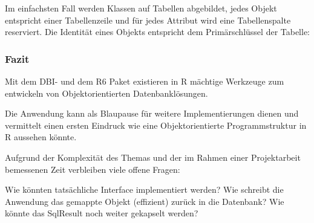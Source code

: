 \documentclass[]{article}
\newenvironment{Shaded}{\begin{snugshade}}{\end{snugshade}}
\newcommand{\CommentTok}[1]{\textcolor[rgb]{0.56,0.35,0.01}{\textit{#1}}}
\newcommand{\DecValTok}[1]{\textcolor[rgb]{0.00,0.00,0.81}{#1}}
\newcommand{\KeywordTok}[1]{\textcolor[rgb]{0.13,0.29,0.53}{\textbf{#1}}}
\newcommand{\NormalTok}[1]{#1}
\newcommand{\OperatorTok}[1]{\textcolor[rgb]{0.81,0.36,0.00}{\textbf{#1}}}
\begin{document}
Im einfachsten Fall werden Klassen auf Tabellen abgebildet, jedes Objekt
entspricht einer Tabellenzeile und für jedes Attribut wird eine
Tabellenspalte reserviert. Die Identität eines Objekts entspricht dem
Primärschlüssel der Tabelle:

\begin{Shaded}
\end{Shaded}

\hypertarget{fazit}{%
\subsubsection{Fazit}\label{fazit}}

Mit dem DBI- und dem R6 Paket existieren in R mächtige Werkzeuge zum
entwickeln von Objektorientierten Datenbanklösungen.

Die Anwendung kann als Blaupause für weitere Implementierungen dienen
und vermittelt einen ersten Eindruck wie eine Objektorientierte
Programmstruktur in R aussehen könnte.

Aufgrund der Komplexität des Themas und der im Rahmen einer
Projektarbeit bemessenen Zeit verbleiben viele offene Fragen:

Wie könnten tatsächliche Interface implementiert werden? Wie schreibt
die Anwendung das gemappte Objekt (effizient) zurück in die Datenbank?
Wie könnte das SqlResult noch weiter gekapselt werden?
\end{document}
